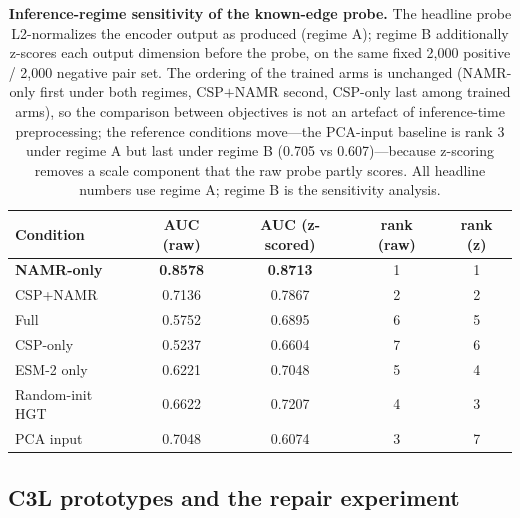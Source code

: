 \documentclass[11pt,a4paper]{article}
\begin{document}
\begin{table}[h]
\centering
\caption{\textbf{Inference-regime sensitivity of the known-edge probe.} The headline probe L2-normalizes the encoder output as produced (regime A); regime B additionally z-scores each output dimension before the probe, on the same fixed 2,000 positive / 2,000 negative pair set. The ordering of the trained arms is unchanged (NAMR-only first under both regimes, CSP$+$NAMR second, CSP-only last among trained arms), so the comparison between objectives is not an artefact of inference-time preprocessing; the reference conditions move---the PCA-input baseline is rank 3 under regime A but last under regime B (0.705 vs 0.607)---because z-scoring removes a scale component that the raw probe partly scores. All headline numbers use regime A; regime B is the sensitivity analysis.}
\label{tab:s24}
\footnotesize
\begin{tabular}{@{}lcccc@{}}
\toprule
\textbf{Condition} & \textbf{AUC (raw)} & \textbf{AUC (z-scored)} & \textbf{rank (raw)} & \textbf{rank (z)} \\
\midrule
\textbf{NAMR-only} & \textbf{0.8578} & \textbf{0.8713} & 1 & 1 \\
CSP+NAMR & 0.7136 & 0.7867 & 2 & 2 \\
Full & 0.5752 & 0.6895 & 6 & 5 \\
CSP-only & 0.5237 & 0.6604 & 7 & 6 \\
ESM-2 only & 0.6221 & 0.7048 & 5 & 4 \\
Random-init HGT & 0.6622 & 0.7207 & 4 & 3 \\
PCA input & 0.7048 & 0.6074 & 3 & 7 \\
\bottomrule
\end{tabular}
\end{table}

\FloatBarrier


\subsection{C3L prototypes and the repair experiment}
\end{document}
